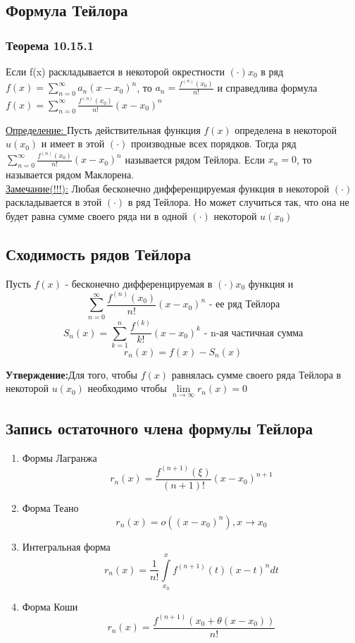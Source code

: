 \documentclass[12pt]{article}
\let\oldint\int
\let\oldsum\sum
\let\oldlim\lim
\renewcommand{\int}{\oldint\limits}
\renewcommand{\sum}{\oldsum\limits}
\renewcommand{\lim}{\oldlim\limits}
\begin{document}
    \subsection{Формула Тейлора}
    \subsubsection*{Теорема 10.15.1}\label{th:10.15.1}
    \par\noindent
    Если f(x) раскладывается в некоторой окрестности $(\cdot) x_0$ в ряд $f(x)=\sum_{n=0}^{\infty}a_n(x-x_0)^n$,
    то $a_n=\frac{f^{(n)}(x_0)}{n!}$ и справедлива формула
    $f(x)=\sum_{n=0}^{\infty} \frac{f^{(n)}(x_0)}{n!}(x-x_0)^n$

    \underline{Определение: } Пусть действительная функция $f(x)$ определена в некоторой $u(x_0)$ и
    имеет в этой $(\cdot)$ производные всех порядков. Тогда ряд $\sum_{n=0}^{\infty} \frac{f^{(n)}(x_0)}{n!}
    (x-x_0)^n$ называется рядом Тейлора. Если $x_n=0$, то называется рядом Маклорена.\\

    \underline{Замечание(!!!):}
    Любая бесконечно дифференцируемая функция в некоторой $(\cdot)$ раскладывается в этой $(\cdot)$ в ряд Тейлора.
    Но может случиться так, что она не будет равна сумме своего ряда ни в одной $(\cdot)$ некоторой $u(x_0)$

    \subsection*{Сходимость рядов Тейлора}
    Пусть $f(x)$ - бесконечно дифференцируемая в $(\cdot) x_0$ функция и 
    \[\sum_{n=0}^{\infty} \frac{f^{(n)}(x_0)}{n!}(x-x_0)^n \text{ - ее ряд Тейлора}\]
    \[S_n(x)=\sum_{k=1}^{n} \frac{f^{(k)}}{k!}(x-x_0)^k\text{ - n-ая частичная сумма}\]
    \[r_n(x)=f(x)-S_n(x)\]
    
    \textbf{Утверждение:}Для того, чтобы $f(x)$ равнялась сумме своего ряда Тейлора в некоторой
    $u(x_0)$ необходимо чтобы $\lim_{n \to \infty}r_n(x)=0$

    \subsection*{Запись остаточного члена формулы Тейлора}
    \begin{enumerate}
      \item Формы Лагранжа
      \[r_n(x)=\frac{f^{(n+1)}(\xi)}{(n+1)!}(x-x_0)^{n+1}\]
      \item Форма Теано
      \[r_n(x)=o((x-x_0)^n), x \to x_0\]
      \item Интегральная форма
      \[r_n(x)=\frac{1}{n!}\int_{x_0}^{x}f^{(n+1)}(t)(x-t)^ndt\]
      \item Форма Коши
      \[r_n(x)=\frac{f^{(n+1)}(x_0+\theta(x-x_0))}{n!}\]
    \end{enumerate}
\end{document}
